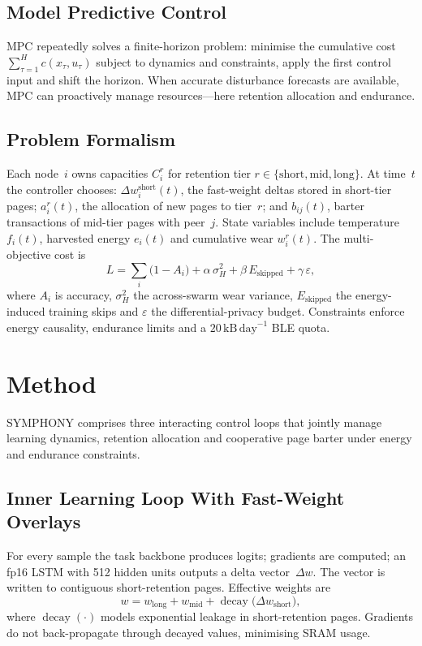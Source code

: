 \documentclass{article}
\begin{document}
\subsection{Model Predictive Control}
MPC repeatedly solves a finite-horizon problem: minimise the cumulative cost $\sum_{\tau=1}^{H} c(x_{\tau},u_{\tau})$ subject to dynamics and constraints, apply the first control input and shift the horizon. When accurate disturbance forecasts are available, MPC can proactively manage resources—here retention allocation and endurance.

\subsection{Problem Formalism}
Each node~$i$ owns capacities $C_{i}^{r}$ for retention tier $r\in\{\text{short},\text{mid},\text{long}\}$. At time~$t$ the controller chooses: $\Delta w_{i}^{\text{short}}(t)$, the fast-weight deltas stored in short-tier pages; $a_{i}^{r}(t)$, the allocation of new pages to tier~$r$; and $b_{ij}(t)$, barter transactions of mid-tier pages with peer~$j$. State variables include temperature $f_{i}(t)$, harvested energy $e_{i}(t)$ and cumulative wear $w_{i}^{r}(t)$. The multi-objective cost is
\[
L = \sum_{i} \bigl(1-A_{i}\bigr) + \alpha\,\sigma_{H}^{2} + \beta\,E_{\text{skipped}} + \gamma\,\varepsilon,
\]
where $A_{i}$ is accuracy, $\sigma_{H}^{2}$ the across-swarm wear variance, $E_{\text{skipped}}$ the energy-induced training skips and $\varepsilon$ the differential-privacy budget. Constraints enforce energy causality, endurance limits and a $20\,\text{kB}\,\text{day}^{-1}$ BLE quota.

\section{Method}\label{sec:method}
SYMPHONY comprises three interacting control loops that jointly manage learning dynamics, retention allocation and cooperative page barter under energy and endurance constraints.

\subsection{Inner Learning Loop With Fast-Weight Overlays}
For every sample the task backbone produces logits; gradients are computed; an fp16 LSTM with 512 hidden units outputs a delta vector~$\Delta w$. The vector is written to contiguous short-retention pages. Effective weights are
\[ w = w_{\mathrm{long}} + w_{\mathrm{mid}} + \operatorname{decay}\bigl(\Delta w_{\mathrm{short}}\bigr), \]
where $\operatorname{decay}(\cdot)$ models exponential leakage in short-retention pages. Gradients do not back-propagate through decayed values, minimising SRAM usage.
\end{document}
